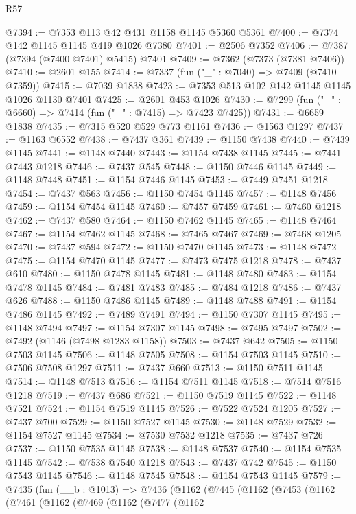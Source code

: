 \begin{lexlean}{R57}
\begin{coremodule}
@7394 := @7353 @113 @42 @431 @1158 @1145 @5360 @5361
@7400 := @7374 @142 @1145 @1145 @419 @1026 @7380
@7401 := @2506 @7352
@7406 := @7387 (@7394 (@7400 @7401) @5415) @7401
@7409 := @7362 (@7373 (@7381 @7406))
@7410 := @2601 @155
@7414 := @7337 (fun ("_" : @7040) => @7409 (@7410 @7359))
@7415 := @7039 @1838
@7423 := @7353 @513 @102 @142 @1145 @1145 @1026 @1130 @7401
@7425 := @2601 @453 @1026
@7430 := @7299 (fun ("_" : @6660) => @7414 (fun ("_" : @7415) => @7423 @7425))
@7431 := @6659 @1838
@7435 := @7315 @520 @529 @773 @1161
@7436 := @1563 @1297
@7437 := @1163 @6552
@7438 := @7437 @361
@7439 := @1150 @7438
@7440 := @7439 @1145
@7441 := @1148 @7440
@7443 := @1154 @7438 @1145
@7445 := @7441 @7443 @1218
@7446 := @7437 @545
@7448 := @1150 @7446 @1145
@7449 := @1148 @7448
@7451 := @1154 @7446 @1145
@7453 := @7449 @7451 @1218
@7454 := @7437 @563
@7456 := @1150 @7454 @1145
@7457 := @1148 @7456
@7459 := @1154 @7454 @1145
@7460 := @7457 @7459
@7461 := @7460 @1218
@7462 := @7437 @580
@7464 := @1150 @7462 @1145
@7465 := @1148 @7464
@7467 := @1154 @7462 @1145
@7468 := @7465 @7467
@7469 := @7468 @1205
@7470 := @7437 @594
@7472 := @1150 @7470 @1145
@7473 := @1148 @7472
@7475 := @1154 @7470 @1145
@7477 := @7473 @7475 @1218
@7478 := @7437 @610
@7480 := @1150 @7478 @1145
@7481 := @1148 @7480
@7483 := @1154 @7478 @1145
@7484 := @7481 @7483
@7485 := @7484 @1218
@7486 := @7437 @626
@7488 := @1150 @7486 @1145
@7489 := @1148 @7488
@7491 := @1154 @7486 @1145
@7492 := @7489 @7491
@7494 := @1150 @7307 @1145
@7495 := @1148 @7494
@7497 := @1154 @7307 @1145
@7498 := @7495 @7497
@7502 := @7492 (@1146 (@7498 @1283 @1158))
@7503 := @7437 @642
@7505 := @1150 @7503 @1145
@7506 := @1148 @7505
@7508 := @1154 @7503 @1145
@7510 := @7506 @7508 @1297
@7511 := @7437 @660
@7513 := @1150 @7511 @1145
@7514 := @1148 @7513
@7516 := @1154 @7511 @1145
@7518 := @7514 @7516 @1218
@7519 := @7437 @686
@7521 := @1150 @7519 @1145
@7522 := @1148 @7521
@7524 := @1154 @7519 @1145
@7526 := @7522 @7524 @1205
@7527 := @7437 @700
@7529 := @1150 @7527 @1145
@7530 := @1148 @7529
@7532 := @1154 @7527 @1145
@7534 := @7530 @7532 @1218
@7535 := @7437 @726
@7537 := @1150 @7535 @1145
@7538 := @1148 @7537
@7540 := @1154 @7535 @1145
@7542 := @7538 @7540 @1218
@7543 := @7437 @742
@7545 := @1150 @7543 @1145
@7546 := @1148 @7545
@7548 := @1154 @7543 @1145
@7579 := @7435
    (fun (__b : @1013) =>
    @7436
      (@1162
        (@7445
          (@1162
            (@7453
              (@1162
                (@7461
                  (@1162
                    (@7469
                      (@1162
                        (@7477
                          (@1162

\end{coremodule}
\end{lexlean}
